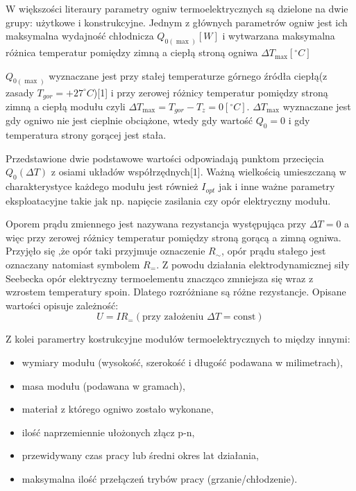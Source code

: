 \documentclass[oneside]{mgr}
\begin{document}
W większości literaury parametry ogniw termoelektrycznych są dzielone na dwie grupy: użytkowe i konstrukcyjne. Jednym z głównych parametrów ogniw jest ich maksymalna wydajność chłodnicza $Q_{0(\max)} [W]$ i wytwarzana maksymalna różnica temperatur pomiędzy zimną a ciepłą stroną ogniwa $\Delta T_{\max} [^{\circ} C]$

$Q_{0(\max)}$ wyznaczane jest przy stałej temperaturze górnego źródła ciepłą(z zasady $T_{gor}=+27^\circ C$)[1] i przy zerowej różnicy temperatur pomiędzy stroną zimną a ciepłą modułu czyli $\Delta T_{\max} = T_{gor} - T_z = 0 [^{\circ} C]$. $\Delta T_{\max}$ wyznaczane jest gdy ogniwo nie jest cieplnie obciążone, wtedy gdy wartość $Q_0 = 0$ i gdy temperatura strony gorącej jest stała.

Przedstawione dwie podstawowe wartości odpowiadają punktom przecięcia $Q_0 (\Delta T)$ z osiami układów współrzędnych[1]. Ważną wielkością umieszczaną w charakterystyce każdego modułu jest również $I_{opt}$ jak i inne ważne parametry eksploatacyjne takie jak np. napięcie zasilania czy opór elektryczny modułu.

Oporem prądu zmiennego jest nazywana rezystancja występująca przy $\Delta T = 0$ a więc przy zerowej różnicy temperatur pomiędzy stroną gorącą a zimną ogniwa. Przyjęło się ,że opór taki przyjmuje oznaczenie $R_\sim$, opór prądu stałego jest oznaczany natomiast symbolem $R_=$. Z powodu działania elektrodynamicznej siły Seebecka opór elektryczny termoelementu znacząco zmniejsza się wraz z wzrostem temperatury spoin. Dlatego rozróżniane są różne rezystancje. Opisane wartości opisuje zależność:
\begin{equation}
    U = IR_ = (\text{przy założeniu } \Delta T = \text{const})
\end{equation}

Z kolei paramertry kostrukcyjne modułów termoelektrycznych to między innymi:
\begin{itemize}
    \item wymiary modułu (wysokość, szerokość i długość podawana w milimetrach),
    \item masa modułu (podawana w gramach),
    \item materiał z którego ogniwo zostało wykonane,
    \item ilość naprzemiennie ułożonych złącz p-n,
    \item przewidywany czas pracy lub średni okres lat działania,
    \item maksymalna ilość przełączeń trybów pracy (grzanie/chłodzenie).
\end{itemize}
\end{document}

